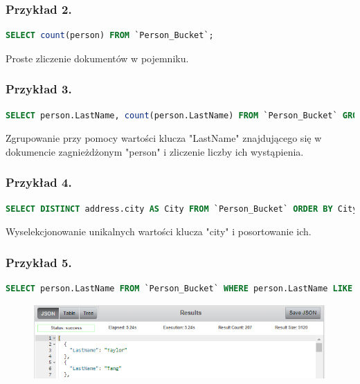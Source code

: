 \documentclass[a4paper,12pt,table]{article}
\begin{document}
{\subsubsection*{Przykład 2.}
\begin{lstlisting}[language=SQL,basicstyle=\footnotesize]
SELECT count(person) FROM `Person_Bucket`;
\end{lstlisting}
\vspace{0.5cm}
Proste zliczenie dokumentów w pojemniku.
\subsubsection*{Przykład 3.}
\begin{lstlisting}[language=SQL,basicstyle=\footnotesize]
SELECT person.LastName, count(person.LastName) FROM `Person_Bucket` GROUP BY person.LastName;
\end{lstlisting}
\vspace{0.5cm}
Zgrupowanie przy pomocy wartości klucza "LastName" znajdującego się w dokumencie zagnieżdżonym "person" i zliczenie liczby ich wystąpienia.
\subsubsection*{Przykład 4.}
\begin{lstlisting}[language=SQL,basicstyle=\footnotesize]
SELECT DISTINCT address.city AS City FROM `Person_Bucket` ORDER BY City ASC;
\end{lstlisting}
\vspace{0.5cm}
Wyselekcjonowanie unikalnych wartości klucza "city" i posortowanie ich.
\subsubsection*{Przykład 5.}
\begin{lstlisting}[language=SQL,basicstyle=\footnotesize]
SELECT person.LastName FROM `Person_Bucket` WHERE person.LastName LIKE 'T%' AND ARRAY_COUNT(email)=2;
\end{lstlisting}
\vspace{0.5cm}
\begin{figure}[h]
\begin{center}
\includegraphics[scale=0.9]{sc/51}


\end{center}
\end{figure}}
\end{document}
